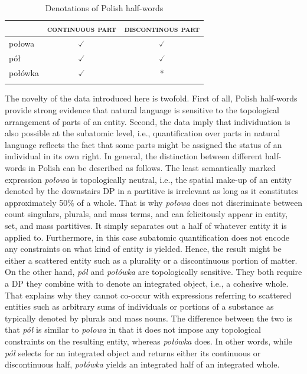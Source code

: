 \begin{table}[h]
			\centering
			\begin{tabular}{lcc}
				\lsptoprule
				& \textsc{continuous part} & \textsc{discontinous part} \\ \midrule
				połowa  & $\checked$    & $\checked$      \\
				pół     & $\checked$    & $\checked$      \\
				połówka & $\checked$    & *                 \\ \lspbottomrule
			\end{tabular}
			\caption{Denotations of Polish half-words}\label{tab:denotations-of-polish-half-words}
		\end{table}

The novelty of the data introduced here is twofold. First of all, Polish half-words provide strong evidence that natural language is sensitive to the topological arrangement of parts of an entity. Second, the data imply that individuation is also possible at the subatomic level, i.e., quantification over parts in natural language reflects the fact that some parts might be assigned the status of an individual in its own right. In general, the distinction between different half-words in Polish can be described as follows. The least semantically marked expression \textit{połowa} is topologically neutral, i.e., the spatial make-up of an entity denoted by the downstairs DP in a partitive is irrelevant as long as it constitutes approximately 50\% of a whole. That is why \textit{połowa} does not discriminate between count singulars, plurals, and mass terms, and can felicitously appear in entity, set, and mass partitives. It simply separates out a half of whatever entity it is applied to. Furthermore, in this case subatomic quantification does not encode any constraints on what kind of entity is yielded. Hence, the result might be either a scattered entity such as a plurality or a discontinuous portion of matter. On the other hand, \textit{pół} and \textit{połówka} are topologically sensitive. They both require a DP they combine with to denote an integrated object, i.e., a cohesive whole. That explains why they cannot co-occur with expressions referring to scattered entities such as arbitrary sums of individuals or portions of a substance as typically denoted by plurals and mass nouns. The difference between the two is that \textit{pół} is similar to \textit{połowa} in that it does not impose any topological constraints on the resulting entity, whereas \textit{połówka} does. In other words, while \textit{pół} selects for an integrated object and returns either its continuous or discontinuous half, \textit{połówka} yields an integrated half of an integrated whole.

